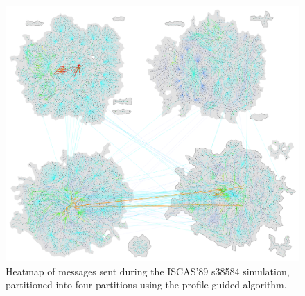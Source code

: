\documentclass[11pt]{book}
\begin{document}
\begin{figure}
\centering
\includegraphics[width=\textwidth,height=0.9\textheight,keepaspectratio]{figs/s38584_4part}
\caption{Heatmap of messages sent during the ISCAS'89 s38584 simulation, partitioned into four partitions using the profile guided algorithm.}
\end{figure}
\end{document}
